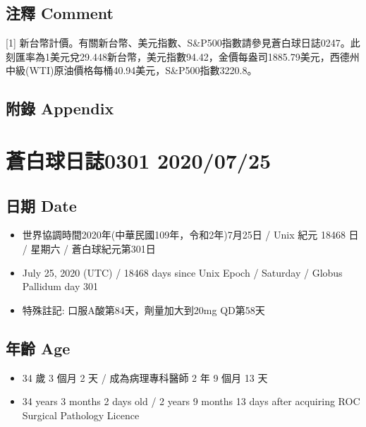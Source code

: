 \documentclass[a5paper, 11pt
]{book}
\providecommand{\tightlist}{%
  \setlength{\itemsep}{0pt}\setlength{\parskip}{0pt}}
\begin{document}
\hypertarget{ux6ce8ux91cb-comment-47}{%
\subsection{注釋 Comment}\label{ux6ce8ux91cb-comment-47}}

{[}1{]}
新台幣計價。有關新台幣、美元指數、S\&P500指數請參見蒼白球日誌0247。此刻匯率為1美元兌29.448新台幣，美元指數94.42，金價每盎司1885.79美元，西德州中級(WTI)原油價格每桶40.94美元，S\&P500指數3220.8。

\hypertarget{ux9644ux9304-appendix-47}{%
\subsection{附錄 Appendix}\label{ux9644ux9304-appendix-47}}

\hypertarget{ux84bcux767dux7403ux65e5ux8a8c0301-20200725}{%
\section{蒼白球日誌0301
2020/07/25}\label{ux84bcux767dux7403ux65e5ux8a8c0301-20200725}}

\hypertarget{ux65e5ux671f-date-48}{%
\subsection{日期 Date}\label{ux65e5ux671f-date-48}}

\begin{itemize}
\tightlist
\item
  世界協調時間2020年(中華民國109年，令和2年)7月25日 / Unix 紀元 18468 日
  / 星期六 / 蒼白球紀元第301日
\item
  July 25, 2020 (UTC) / 18468 days since Unix Epoch / Saturday / Globus
  Pallidum day 301
\item
  特殊註記: 口服A酸第84天，劑量加大到20mg QD第58天
\end{itemize}

\hypertarget{ux5e74ux9f61-age-48}{%
\subsection{年齡 Age}\label{ux5e74ux9f61-age-48}}

\begin{itemize}
\tightlist
\item
  34 歲 3 個月 2 天 / 成為病理專科醫師 2 年 9 個月 13 天
\item
  34 years 3 months 2 days old / 2 years 9 months 13 days after
  acquiring ROC Surgical Pathology Licence
\end{itemize}
\end{document}
